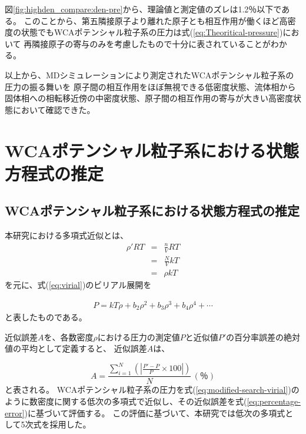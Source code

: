 \documentclass[titlepage]{jsreport}
\begin{document}
{{{図\ref{fig:highden_compare:den-pre}から、理論値と測定値のズレは1.2％以下である。
このことから、第五隣接原子より離れた原子とも相互作用が働くほど高密度の状態でもWCAポテンシャル粒子系の圧力は式(\ref{eq:Theoritical-pressure})において
再隣接原子の寄与のみを考慮したもので十分に表されていることがわかる。

以上から、MDシミュレーションにより測定されたWCAポテンシャル粒子系の圧力の振る舞いを
原子間の相互作用をほぼ無視できる低密度状態、流体相から固体相への相転移近傍の中密度状態、原子間の相互作用の寄与が大きい高密度状態において確認できた。



\newpage
\section{WCAポテンシャル粒子系における状態方程式の推定}\label{results-sec:WCA-equation}


\subsection{WCAポテンシャル粒子系における状態方程式の推定}\label{results-subsec:WCA-equation}
本研究における多項式近似とは、
\large
\begin{eqnarray}
    {{\rho}'}RT \nonumber &=& \frac{n}{V}RT \nonumber \\ 
    &=& \frac{N}{V}kT \nonumber \\ 
    &=& {\rho}kT \nonumber
\end{eqnarray}
\normalsize
を元に、式(\ref{eq:virial})のビリアル展開を

\large
\begin{eqnarray}
    P=kT\rho+b_2\rho^2+b_3\rho^3+b_4\rho^4+\cdots\label{eq:modified-search-virial}
\end{eqnarray}
\normalsize
と表したものである。

近似誤差$A$を、各数密度$\rho$における圧力の測定値$P$と近似値$P'$の百分率誤差の絶対値の平均として定義すると、
近似誤差$A$は、

\large
\begin{equation}
    A=\frac{\sum_{i=1}^N\left(|\frac{P'-P}{P}\times100|\right)}{N}\,(％)\label{eq:percentage-error}
\end{equation}
\normalsize
と表される。
WCAポテンシャル粒子系の圧力を式(\ref{eq:modified-search-virial})のように数密度に関する低次の多項式で近似し、その近似誤差を式(\ref{eq:percentage-error})に基づいて評価する。
この評価に基づいて、本研究では低次の多項式として5次式を採用した。

}}}
\end{document}
